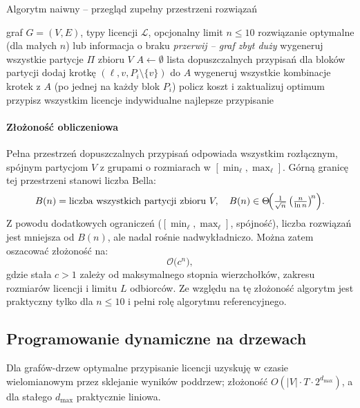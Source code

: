 \begin{algorithm}[H]
\caption{Algorytm naiwny – przegląd zupełny przestrzeni rozwiązań}
\label{alg:naive}
\begin{algorithmic}[1]
\Require graf \(G=(V,E)\), typy licencji \(\mathcal{L}\), opcjonalny limit \(n\le 10\)
\Ensure rozwiązanie optymalne (dla małych \(n\)) lub informacja o braku
 \State \Return \textit{przerwij – graf zbyt duży} \EndIf
\State wygeneruj wszystkie partycje \(\Pi\) zbioru \(V\)
  \State \(A\gets\emptyset\) \Comment lista dopuszczalnych przypisań dla bloków partycji
        \State dodaj krotkę \((\ell, v, P_i\setminus\{v\})\) do \(A\)
      \EndIf
    \EndFor
  \EndFor
  \State wygeneruj wszystkie kombinacje krotek z \(A\) (po jednej na każdy blok \(P_i\))
     \State policz koszt i zaktualizuj optimum \EndIf
  \EndFor
\EndFor
{} \State przypisz wszystkim licencje indywidualne \EndIf
\State \Return najlepsze przypisanie
\end{algorithmic}
\end{algorithm}

\paragraph{Złożoność obliczeniowa}
Pełna przestrzeń dopuszczalnych przypisań odpowiada wszystkim rozłącznym, spójnym partycjom $V$ z grupami o rozmiarach w $[\min_\ell,\max_\ell]$. Górną granicę tej przestrzeni stanowi liczba Bella:
\[
B(n)=\text{liczba wszystkich partycji zbioru }V,\quad
B(n)\in\Theta\!\Bigl(\tfrac{1}{\sqrt n}\,\bigl(\tfrac{n}{\ln n}\bigr)^{\!n}\Bigr).
\]
Z powodu dodatkowych ograniczeń ($[\min_\ell,\max_\ell]$, spójność), liczba rozwiązań jest mniejsza od $B(n)$, ale nadal rośnie nadwykładniczo. Można zatem oszacować złożoność na:
\[
\mathcal{O}\bigl(c^n\bigr),
\]
gdzie stała $c>1$ zależy od maksymalnego stopnia wierzchołków, zakresu rozmiarów licencji i limitu $L$ odbiorców. Ze względu na tę złożoność algorytm jest praktyczny tylko dla $n\le10$ i pełni rolę algorytmu referencyjnego.  

\subsection{Programowanie dynamiczne na drzewach}
Dla grafów-drzew optymalne przypisanie licencji uzyskuję w czasie wielomianowym przez sklejanie wyników poddrzew; złożoność $O(|V|\cdot T \cdot 2^{d_{\max}})$, a dla stałego $d_{\max}$ praktycznie liniowa.


